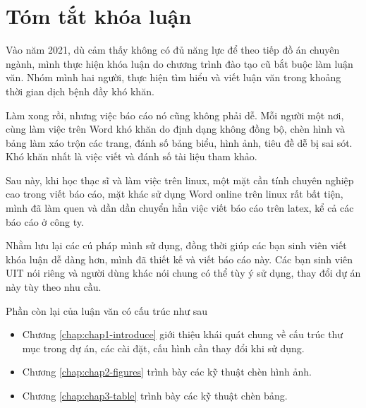 \chapter*{\centering\Large{Tóm tắt khóa luận}}

Vào năm 2021, dù cảm thấy không có đủ năng lực để theo tiếp đồ án chuyên ngành, mình thực hiện khóa luận do chương trình đào tạo cũ bắt buộc làm luận văn. Nhóm mình hai người, thực hiện tìm hiểu và viết luận văn trong khoảng thời gian dịch bệnh đầy khó khăn.

Làm xong rồi, nhưng việc báo cáo nó cũng không phải dễ. Mỗi người một nơi, cùng làm việc trên Word khó khăn do định dạng không đồng bộ, chèn hình và bảng làm xáo trộn các trang, đánh số bảng biểu, hình ảnh, tiêu đề dễ bị sai sót. Khó khăn nhất là việc viết và đánh số tài liệu tham khảo.

Sau này, khi học thạc sĩ và làm việc trên linux, một mặt cần tính chuyên nghiệp cao trong viết báo cáo, mặt khác sử dụng Word online trên linux rất bất tiện, mình đã làm quen và dần dần chuyển hẳn việc viết báo cáo trên latex, kể cả các báo cáo ở công ty.

Nhằm lưu lại các cú pháp mình sử dụng, đồng thời giúp các bạn sinh viên viết khóa luận dễ dàng hơn, mình đã thiết kế và viết báo cáo này. Các bạn sinh viên UIT nói riêng và người dùng khác nói chung có thể tùy ý sử dụng, thay đổi dự án này tùy theo nhu cầu.

Phần còn lại của luận văn có cấu trúc như sau
\begin{itemize}
    \item Chương \ref{chap:chap1-introduce} giới thiệu khái quát chung về cấu trúc thư mục trong dự án, các cài đặt, cấu hình cần thay đổi khi sử dụng.
    \item Chương \ref{chap:chap2-figures} trình bày các kỹ thuật chèn hình ảnh.
    \item Chương \ref{chap:chap3-table} trình bày các kỹ thuật chèn bảng.
\end{itemize}